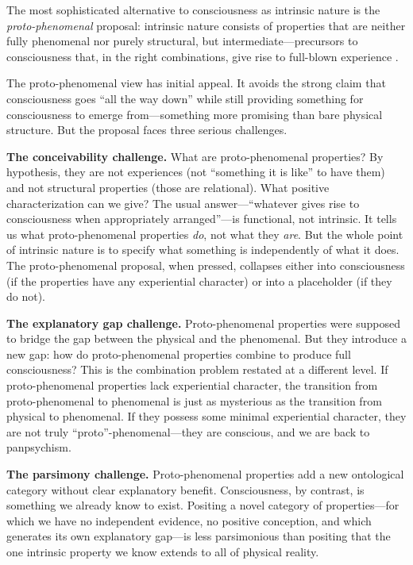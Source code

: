 \documentclass[11pt,a4paper]{article}
\theoremstyle{definition}
\theoremstyle{plain}
\theoremstyle{remark}
\begin{document}
The most sophisticated alternative to consciousness as intrinsic nature is the \textit{proto-phenomenal} proposal: intrinsic nature consists of properties that are neither fully phenomenal nor purely structural, but intermediate---precursors to consciousness that, in the right combinations, give rise to full-blown experience \citep{Chalmers1996}.

The proto-phenomenal view has initial appeal. It avoids the strong claim that consciousness goes ``all the way down'' while still providing something for consciousness to emerge from---something more promising than bare physical structure. But the proposal faces three serious challenges.

\textbf{The conceivability challenge.} What are proto-phenomenal properties? By hypothesis, they are not experiences (not ``something it is like'' to have them) and not structural properties (those are relational). What positive characterization can we give? The usual answer---``whatever gives rise to consciousness when appropriately arranged''---is functional, not intrinsic. It tells us what proto-phenomenal properties \textit{do}, not what they \textit{are}. But the whole point of intrinsic nature is to specify what something is independently of what it does. The proto-phenomenal proposal, when pressed, collapses either into consciousness (if the properties have any experiential character) or into a placeholder (if they do not).

\textbf{The explanatory gap challenge.} Proto-phenomenal properties were supposed to bridge the gap between the physical and the phenomenal. But they introduce a new gap: how do proto-phenomenal properties combine to produce full consciousness? This is the combination problem restated at a different level. If proto-phenomenal properties lack experiential character, the transition from proto-phenomenal to phenomenal is just as mysterious as the transition from physical to phenomenal. If they possess some minimal experiential character, they are not truly ``proto''-phenomenal---they are conscious, and we are back to panpsychism.

\textbf{The parsimony challenge.} Proto-phenomenal properties add a new ontological category without clear explanatory benefit. Consciousness, by contrast, is something we already know to exist. Positing a novel category of properties---for which we have no independent evidence, no positive conception, and which generates its own explanatory gap---is less parsimonious than positing that the one intrinsic property we know extends to all of physical reality.
\end{document}
